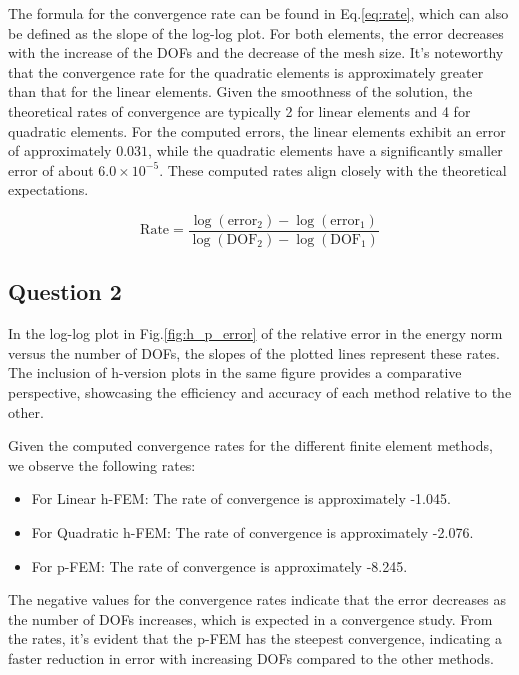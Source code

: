 \documentclass[twoside,twocolumn,10pt]{article}
\begin{document}
The formula for the convergence rate can be found in Eq.\ref{eq:rate}, which can also be defined as the slope of the log-log plot. For both elements, the error decreases with the increase of the DOFs and the decrease of the mesh size. It's noteworthy that the convergence rate for the quadratic elements is approximately greater than that for the linear elements. Given the smoothness of the solution, the theoretical rates of convergence are typically 2 for linear elements and 4 for quadratic elements. For the computed errors, the linear elements exhibit an error of approximately \(0.031\), while the quadratic elements have a significantly smaller error of about \(6.0 \times 10^{-5}\). These computed rates align closely with the theoretical expectations.

\begin{equation}
\text{Rate} = \frac{\log(\text{error}_2) - \log(\text{error}_1)}{\log(\text{DOF}_2) - \log(\text{DOF}_1)}
\label{eq:rate}
\end{equation}

\subsection{Question 2}
In the log-log plot in Fig.\ref{fig:h_p_error} of the relative error in the energy norm versus the number of DOFs, the slopes of the plotted lines represent these rates. The inclusion of h-version plots in the same figure provides a comparative perspective, showcasing the efficiency and accuracy of each method relative to the other.

Given the computed convergence rates for the different finite element methods, we observe the following rates:
\begin{itemize}
    \item For Linear h-FEM: The rate of convergence is approximately -1.045.
    \item For Quadratic h-FEM: The rate of convergence is approximately -2.076.
    \item For p-FEM: The rate of convergence is approximately -8.245.
\end{itemize}
The negative values for the convergence rates indicate that the error decreases as the number of DOFs increases, which is expected in a convergence study. From the rates, it's evident that the p-FEM has the steepest convergence, indicating a faster reduction in error with increasing DOFs compared to the other methods. 
\end{document}
